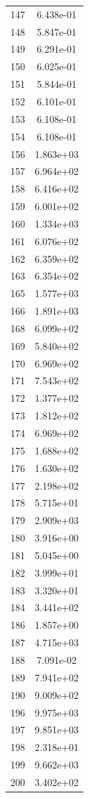 \documentclass[12pt]{article}
\begin{document}
\begin{longtable}{@{}cc@{}}
147 & 6.438e-01 \\
148 & 5.847e-01 \\
149 & 6.291e-01 \\
150 & 6.025e-01 \\
151 & 5.844e-01 \\
152 & 6.101e-01 \\
153 & 6.108e-01 \\
154 & 6.108e-01 \\
156 & 1.863e+03 \\
157 & 6.964e+02 \\
158 & 6.416e+02 \\
159 & 6.001e+02 \\
160 & 1.334e+03 \\
161 & 6.076e+02 \\
162 & 6.359e+02 \\
163 & 6.354e+02 \\
165 & 1.577e+03 \\
166 & 1.891e+03 \\
168 & 6.099e+02 \\
169 & 5.840e+02 \\
170 & 6.969e+02 \\
171 & 7.543e+02 \\
172 & 1.377e+02 \\
173 & 1.812e+02 \\
174 & 6.969e+02 \\
175 & 1.688e+02 \\
176 & 1.630e+02 \\
177 & 2.198e+02 \\
178 & 5.715e+01 \\
179 & 2.909e+03 \\
180 & 3.916e+00 \\
181 & 5.045e+00 \\
182 & 3.999e+01 \\
183 & 3.320e+01 \\
184 & 3.441e+02 \\
186 & 1.857e+00 \\
187 & 4.715e+03 \\
188 & 7.091e-02 \\
189 & 7.941e+02 \\
190 & 9.009e+02 \\
196 & 9.975e+03 \\
197 & 9.851e+03 \\
198 & 2.318e+01 \\
199 & 9.662e+03 \\
200 & 3.402e+02 \\

\end{longtable}
\end{document}
